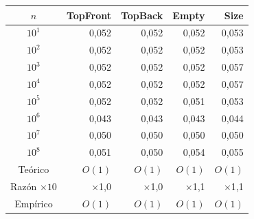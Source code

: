 \begin{tabular}{crrrr}
\toprule
$n$ & \textbf{TopFront} & \textbf{TopBack} & \textbf{Empty} & \textbf{Size} \\
\midrule
$10^{1}$ & 0{,}052 & 0{,}052 & 0{,}052 & 0{,}053 \\
$10^{2}$ & 0{,}052 & 0{,}052 & 0{,}052 & 0{,}053 \\
$10^{3}$ & 0{,}052 & 0{,}052 & 0{,}052 & 0{,}057 \\
$10^{4}$ & 0{,}052 & 0{,}052 & 0{,}052 & 0{,}057 \\
$10^{5}$ & 0{,}052 & 0{,}052 & 0{,}051 & 0{,}053 \\
$10^{6}$ & 0{,}043 & 0{,}043 & 0{,}043 & 0{,}044 \\
$10^{7}$ & 0{,}050 & 0{,}050 & 0{,}050 & 0{,}050 \\
$10^{8}$ & 0{,}051 & 0{,}050 & 0{,}054 & 0{,}055 \\
\midrule
Teórico & $O(1)$ & $O(1)$ & $O(1)$ & $O(1)$ \\
Razón $\times 10$ & $\times$1{,}0 & $\times$1{,}0 & $\times$1{,}1 & $\times$1{,}1 \\
Empírico & $O(1)$ & $O(1)$ & $O(1)$ & $O(1)$ \\
\bottomrule
\end{tabular}